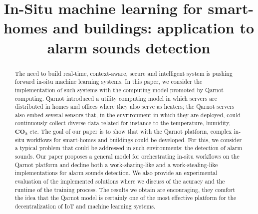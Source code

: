 \documentclass[10pt, conference, compsocconf]{IEEEtran}
\begin{document}
%
\title{In-Situ machine learning for smart-homes and buildings: application to alarm sounds detection}



\author{
\and
{}
\and
{}
}

\maketitle


\begin{abstract}
The need to build real-time, context-aware, secure and intelligent system is pushing forward in-situ machine learning systems. 
In this paper, we consider the implementation of such systems with the computing model promoted by 
Qarnot computing. Qarnot introduced a utility computing model in which servers are distributed in homes and offices where they also 
serve as heaters; the Qarnot servers also embed several sensors that, in the envrironment in which they are deployed, could continuously 
collect diverse data related for instance to the temperature, humidity, $\mathbf{CO_2}$ etc. The goal of our paper is to show that with the Qarnot 
platform, complex in-situ workflows for smart-homes and buildings could be developed. For this, we consider a typical problem that could be addressed in such environments: the detection of alarm sounds. Our paper proposes a general model for 
orchestrating in-situ workflows on 
the Qarnot platform and decline both a work-sharing-like and a work-stealing-like implementations for alarm sounds detection. 
We also provide an experimental evaluation of the implemented solutions where we discuss of the acuracy and the runtime of the training process. The results we obtain are encouraging, they comfort the idea that the Qarnot model is certainly one of the most effective platform for the decentralization of IoT and machine learning systems. 
\end{abstract}
\end{document}
